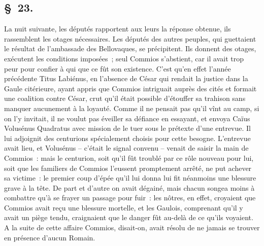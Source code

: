 \documentclass[french,twoside]{book} %
\begin{document}
\subsection[{§ 23.}]{ \textsc{§ 23.} }
\noindent La nuit suivante, les députés rapportent aux leurs la réponse obtenue, ils rassemblent les otages nécessaires. Les députés des autres peuples, qui guettaient le résultat de l’ambassade des Bellovaques, se précipitent. Ils donnent des otages, exécutent les conditions imposées ; seul Commios s’abstient, car il avait trop peur pour confier à qui que ce fût son existence. C'est qu’en effet l’année précédente Titus Labiénus, en l’absence de César qui rendait la justice dans la Gaule citérieure, ayant appris que Commios intriguait auprès des cités et formait une coalition contre César, crut qu’il était possible d’étouffer sa trahison sans manquer aucunement à la loyauté. Comme il ne pensait pas qu’il vînt au camp, si on l’y invitait, il ne voulut pas éveiller sa défiance en essayant, et envoya Caïus Volusénus Quadratus avec mission de le tuer sous le prétexte d’une entrevue. Il lui adjoignit des centurions spécialement choisis pour cette besogne. L'entrevue avait lieu, et Volusénus – c’était le signal convenu – venait de saisir la main de Commios : mais le centurion, soit qu’il fût troublé par ce rôle nouveau pour lui, soit que les familiers de Commios l’eussent promptement arrêté, ne put achever sa victime : le premier coup d’épée qu’il lui donna lui fit néanmoins une blessure grave à la tête. De part et d’autre on avait dégainé, mais chacun songea moins à combattre qu’à se frayer un passage pour fuir : les nôtres, en effet, croyaient que Commios avait reçu une blessure mortelle, et les Gaulois, comprenant qu’il y avait un piège tendu, craignaient que le danger fût au-delà de ce qu’ils voyaient. A la suite de cette affaire Commios, disait-on, avait résolu de ne jamais se trouver en présence d’aucun Romain.
\end{document}

